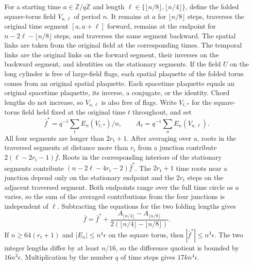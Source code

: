 \documentclass[11pt,a4paper]{article}
\numberwithin{equation}{section}
\begin{document}
For a starting time \(a\in\mathbb Z/q\mathbb Z\) and length \(\ell\in\{\lfloor n/8\rfloor,\lfloor n/4\rfloor\}\), define the folded square-torus field \(V_{a,\ell}\) of period \(n\). It remains at \(a\) for \(\lfloor n/8\rfloor\) steps, traverses the original time segment \([a,a+\ell]\) forward, remains at the endpoint for \(n-2\ell-\lfloor n/8\rfloor\) steps, and traverses the same segment backward. The spatial links are taken from the original field at the corresponding times. The temporal links are the original links on the forward segment, their inverses on the backward segment, and identities on the stationary segments. If the field \(U\) on the long cylinder is free of large-field flags, each spatial plaquette of the folded torus comes from an original spatial plaquette. Each spacetime plaquette equals an original spacetime plaquette, its inverse, a conjugate, or the identity. Chord lengths do not increase, so \(V_{a,\ell}\) is also free of flags. Write \(V_{t,*}\) for the square-torus field held fixed at the original time \(t\) throughout, and set
\[
 \bar f^*=q^{-1}\sum_t E_n(V_{t,*})/n,\qquad
 A_\ell=q^{-1}\sum_a E_n(V_{a,\ell}).
\]
All four segments are longer than \(2r_{\mathrm t}+1\). After averaging over \(a\), roots in the traversed segments at distance more than \(r_{\mathrm t}\) from a junction contribute \(2(\ell-2r_{\mathrm t}-1)\bar f\). Roots in the corresponding interiors of the stationary segments contribute \((n-2\ell-4r_{\mathrm t}-2)\bar f^*\). The \(2r_{\mathrm t}+1\) time roots near a junction depend only on the stationary endpoint and the \(2r_{\mathrm t}\) steps on the adjacent traversed segment. Both endpoints range over the full time circle as \(a\) varies, so the sum of the averaged contributions from the four junctions is independent of \(\ell\). Subtracting the equations for the two folding lengths gives
\begin{equation}
 \bar f=\bar f^*+
   \frac{A_{\lfloor n/4\rfloor}-A_{\lfloor n/8\rfloor}}
        {2(\lfloor n/4\rfloor-\lfloor n/8\rfloor)} .
 \label{eq:geom-folding-identity}
\end{equation}
If \(n\ge64(r_{\mathrm t}+1)\) and \(|E_n|\le n^4\epsilon\) on the square torus, then \(|\bar f^*|\le n^3\epsilon\). The two integer lengths differ by at least \(n/16\), so the difference quotient is bounded by \(16n^3\epsilon\). Multiplication by the number \(q\) of time steps gives \(17kn^4\epsilon\).
\end{document}
